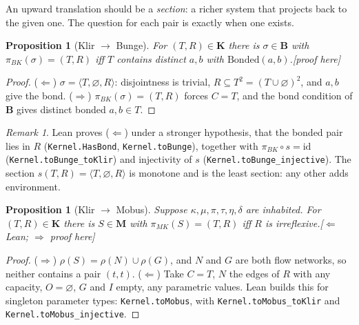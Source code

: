 \documentclass[11pt]{article}
\newtheorem{proposition}[theorem]{Proposition}
\theoremstyle{definition}
\theoremstyle{remark}
\newtheorem{remark}[theorem]{Remark}
\newcommand{\K}{\mathbf{K}}
\newcommand{\B}{\mathbf{B}}
\newcommand{\M}{\mathbf{M}}
\newcommand{\Bonded}{\mathrm{Bonded}}
\newcommand{\lean}[1]{\texttt{#1}}
\newcommand{\status}[1]{\hfill\textsf{\small[#1]}}
\newcommand{\pBK}{\pi_{BK}}
\newcommand{\pMK}{\pi_{MK}}
\begin{document}
An upward translation should be a \emph{section}: a richer system that projects back to the given one. The question for each pair is exactly when one exists.

\begin{proposition}[Klir $\to$ Bunge]\label{prop:KB}
For $(T,R)\in\K$ there is $\sigma\in\B$ with $\pBK(\sigma)=(T,R)$ iff $T$ contains distinct $a,b$ with $\Bonded(a,b)$.\status{proof here}
\end{proposition}
\begin{proof}
($\Leftarrow$) $\sigma=\langle T,\varnothing,R\rangle$: disjointness is trivial, $R\subseteq T^2=(T\cup\varnothing)^2$, and $a,b$ give the bond. ($\Rightarrow$) $\pBK(\sigma)=(T,R)$ forces $C=T$, and the bond condition of $\B$ gives distinct bonded $a,b\in T$.
\end{proof}

\begin{remark}
Lean proves ($\Leftarrow$) under a stronger hypothesis, that the bonded pair lies in $R$ (\lean{Kernel.HasBond}, \lean{Kernel.toBunge}), together with $\pBK\circ s=\mathrm{id}$ (\lean{Kernel.toBunge\_toKlir}) and injectivity of $s$ (\lean{Kernel.toBunge\_injective}). The section $s(T,R)=\langle T,\varnothing,R\rangle$ is monotone and is the least section: any other adds environment.
\end{remark}

\begin{proposition}[Klir $\to$ Mobus]\label{prop:KM}
Suppose $\kappa,\mu,\pi,\tau,\eta,\delta$ are inhabited. For $(T,R)\in\K$ there is $S\in\M$ with $\pMK(S)=(T,R)$ iff $R$ is irreflexive.\status{$\Leftarrow$ Lean; $\Rightarrow$ proof here}
\end{proposition}
\begin{proof}
($\Rightarrow$) $\rho(S)=\rho(N)\cup\rho(G)$, and $N$ and $G$ are both flow networks, so neither contains a pair $(t,t)$. ($\Leftarrow$) Take $C=T$, $N$ the edges of $R$ with any capacity, $O=\varnothing$, $G$ and $I$ empty, any parametric values. Lean builds this for singleton parameter types: \lean{Kernel.toMobus}, with \lean{Kernel.toMobus\_toKlir} and \lean{Kernel.toMobus\_injective}.
\end{proof}
\end{document}
